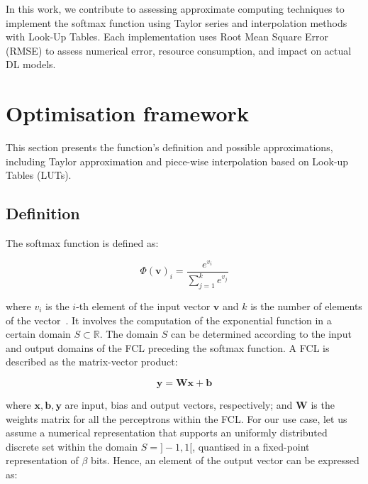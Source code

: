 \documentclass[conference]{IEEEtran}
\begin{document}

In this work, we contribute to assessing approximate computing techniques to implement the softmax function using Taylor series and interpolation methods with Look-Up Tables. Each implementation uses Root Mean Square Error (RMSE) to assess numerical error, resource consumption, and impact on actual DL models.

\section{Optimisation framework}

This section presents the function's definition and possible approximations, including Taylor approximation and piece-wise interpolation based on Look-up Tables (LUTs).

\subsection{Definition}

The softmax function is defined as:

\begin{equation}
  \Phi(\mathbf{v})_i = \frac{e^{v_i}}{\sum_{j=1}^k e^{v_j}}
\end{equation}

\noindent
where $v_i$ is the $i$-th element of the input vector $\mathbf{v}$ and $k$ is the number of elements of the vector~\cite{nns}. It involves the computation of the exponential function in a certain domain $S \subset \mathbb{R}$. The domain $S$ can be determined according to the input and output domains of the FCL preceding the softmax function. A FCL is described as the matrix-vector product:

\begin{equation}
    \mathbf{y} = \mathbf{W} \mathbf{x} + \mathbf{b}
\end{equation}

\noindent
where $\mathbf{x}, \mathbf{b}, \mathbf{y}$ are input, bias and output vectors, respectively; and $\mathbf{W}$ is the weights matrix for all the perceptrons within the FCL. For our use case, let us assume a numerical representation that supports an uniformly distributed discrete set within the domain $S = ]-1,1[$, quantised in a fixed-point representation of $\beta$ bits. Hence, an element of the output vector can be expressed as:
\end{document}
